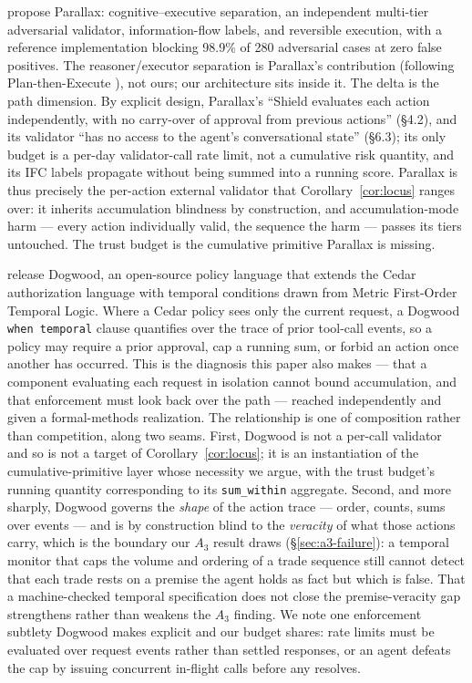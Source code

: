 \documentclass[11pt]{article}
\begin{document}
\citet{fokou2026parallax} propose Parallax: cognitive--executive separation, an independent multi-tier adversarial validator, information-flow labels, and reversible execution, with a reference implementation blocking 98.9\% of 280 adversarial cases at zero false positives. The reasoner/executor separation is Parallax's contribution (following Plan-then-Execute \citep{delrosario2025planex}), not ours; our architecture sits inside it. The delta is the path dimension. By explicit design, Parallax's ``Shield evaluates each action independently, with no carry-over of approval from previous actions'' (\S4.2), and its validator ``has no access to the agent's conversational state'' (\S6.3); its only budget is a per-day validator-call rate limit, not a cumulative risk quantity, and its IFC labels propagate without being summed into a running score. Parallax is thus precisely the per-action external validator that Corollary~\ref{cor:locus} ranges over: it inherits accumulation blindness by construction, and accumulation-mode harm --- every action individually valid, the sequence the harm --- passes its tiers untouched. The trust budget is the cumulative primitive Parallax is missing.

\citet{brooker2026dogwood} release Dogwood, an open-source policy language that extends the Cedar authorization language with temporal conditions drawn from Metric First-Order Temporal Logic. Where a Cedar policy sees only the current request, a Dogwood \texttt{when temporal} clause quantifies over the trace of prior tool-call events, so a policy may require a prior approval, cap a running sum, or forbid an action once another has occurred. This is the diagnosis this paper also makes --- that a component evaluating each request in isolation cannot bound accumulation, and that enforcement must look back over the path --- reached independently and given a formal-methods realization. The relationship is one of composition rather than competition, along two seams. First, Dogwood is not a per-call validator and so is not a target of Corollary~\ref{cor:locus}; it is an instantiation of the cumulative-primitive layer whose necessity we argue, with the trust budget's running quantity corresponding to its \texttt{sum\_within} aggregate. Second, and more sharply, Dogwood governs the \emph{shape} of the action trace --- order, counts, sums over events --- and is by construction blind to the \emph{veracity} of what those actions carry, which is the boundary our $A_3$ result draws (\S\ref{sec:a3-failure}): a temporal monitor that caps the volume and ordering of a trade sequence still cannot detect that each trade rests on a premise the agent holds as fact but which is false. That a machine-checked temporal specification does not close the premise-veracity gap strengthens rather than weakens the $A_3$ finding. We note one enforcement subtlety Dogwood makes explicit and our budget shares: rate limits must be evaluated over request events rather than settled responses, or an agent defeats the cap by issuing concurrent in-flight calls before any resolves.
\end{document}
